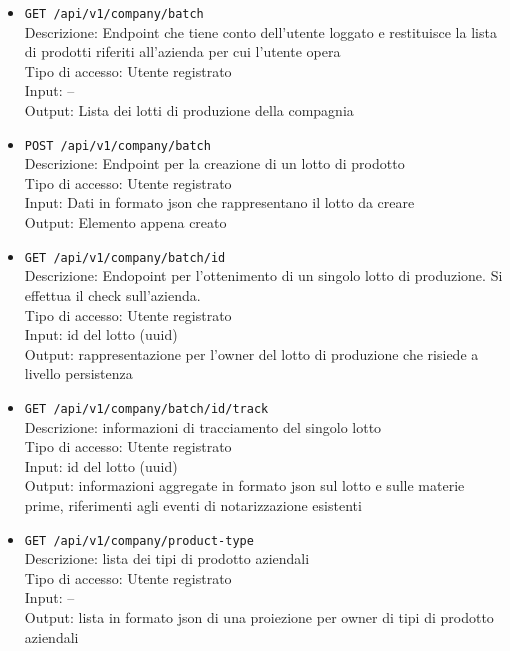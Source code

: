 \documentclass[a4paper,11pt]{article}
\begin{document}
\begin{itemize}
  \item \texttt{GET /api/v1/company/batch}
        \\ Descrizione: Endpoint che tiene conto dell'utente loggato e restituisce la lista di prodotti riferiti all'azienda per cui l'utente opera
        \\ Tipo di accesso: Utente registrato
        \\ Input: --
        \\ Output: Lista dei lotti di produzione della compagnia

  \item \texttt{POST /api/v1/company/batch}
        \\ Descrizione: Endpoint per la creazione di un lotto di prodotto
        \\ Tipo di accesso: Utente registrato
        \\ Input: Dati in formato json che rappresentano il lotto da creare
        \\ Output: Elemento appena creato

  \item \texttt{GET /api/v1/company/batch/{{id}}}
        \\ Descrizione: Endopoint per l'ottenimento di un singolo lotto di produzione. Si effettua il check sull'azienda.
        \\ Tipo di accesso: Utente registrato
        \\ Input: id del lotto (uuid)
        \\ Output: rappresentazione per l'owner del lotto di produzione che risiede a livello persistenza

  \item \texttt{GET /api/v1/company/batch/{{id}}/track}
        \\ Descrizione: informazioni di tracciamento del singolo lotto
        \\ Tipo di accesso: Utente registrato
        \\ Input: id del lotto (uuid)
        \\ Output: informazioni aggregate in formato json sul lotto e sulle materie prime, riferimenti agli eventi di notarizzazione esistenti

  \item \texttt{GET /api/v1/company/product-type}
        \\ Descrizione: lista dei tipi di prodotto aziendali
        \\ Tipo di accesso: Utente registrato
        \\ Input: --
        \\ Output: lista in formato json di una proiezione per owner di tipi di prodotto aziendali


\end{itemize}
\end{document}
